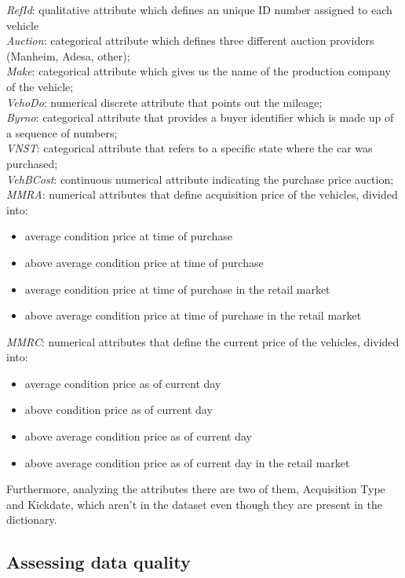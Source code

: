 \documentclass{article}
\begin{document}
\emph{RefId}: qualitative attribute which defines an unique ID number assigned to each vehicle\\
\emph{Auction}: categorical attribute which defines three different auction providers (Manheim, Adesa, other);\\
\emph{Make}: categorical attribute which gives us the name of the production company of the vehicle;\\
\emph{VehoDo}: numerical discrete attribute that points out the mileage;\\
\emph{Byrno}: categorical attribute that provides a buyer identifier which is made up of a sequence of numbers;\\
\emph{VNST}: categorical attribute that refers to a specific state where the car was purchased;\\
\emph{VehBCost}: continuous numerical attribute indicating the purchase price auction;\\
\emph{MMRA}: numerical attributes that define acquisition price of the vehicles, divided into:
\begin{itemize}
\item average condition price at time of purchase 
\item above average condition price at time of purchase
\item average condition price at time of purchase in the retail market
\item above average condition price at time of purchase in the retail market 
\end{itemize}

\emph{MMRC}: numerical attributes that define the current price of the vehicles, divided into:\\
\begin{itemize}
\item average condition price as of current day 
\item above condition price as of current day
\item above average condition price as of current day
\item above average condition  price as of current day in the retail market\\
\end{itemize}

Furthermore, analyzing the attributes there are two of them, Acquisition Type and Kickdate, which aren't in the dataset even though they are present in the dictionary.



\subsection{Assessing data quality}
\end{document}
